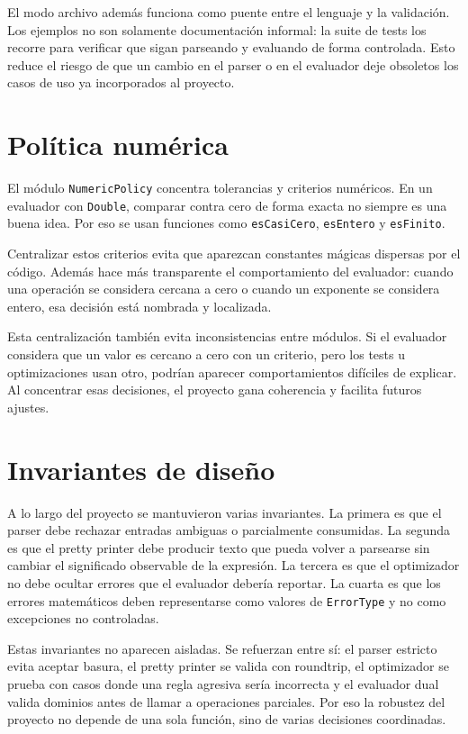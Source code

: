 \documentclass[11pt,a4paper]{article}
\begin{document}
El modo archivo además funciona como puente entre el lenguaje y la validación. Los ejemplos no son solamente documentación informal: la suite de tests los recorre para verificar que sigan parseando y evaluando de forma controlada. Esto reduce el riesgo de que un cambio en el parser o en el evaluador deje obsoletos los casos de uso ya incorporados al proyecto.

\section{Política numérica}

El módulo \texttt{NumericPolicy} concentra tolerancias y criterios numéricos. En un evaluador con \texttt{Double}, comparar contra cero de forma exacta no siempre es una buena idea. Por eso se usan funciones como \texttt{esCasiCero}, \texttt{esEntero} y \texttt{esFinito}.

Centralizar estos criterios evita que aparezcan constantes mágicas dispersas por el código. Además hace más transparente el comportamiento del evaluador: cuando una operación se considera cercana a cero o cuando un exponente se considera entero, esa decisión está nombrada y localizada.

Esta centralización también evita inconsistencias entre módulos. Si el evaluador considera que un valor es cercano a cero con un criterio, pero los tests u optimizaciones usan otro, podrían aparecer comportamientos difíciles de explicar. Al concentrar esas decisiones, el proyecto gana coherencia y facilita futuros ajustes.

\section{Invariantes de diseño}

A lo largo del proyecto se mantuvieron varias invariantes. La primera es que el parser debe rechazar entradas ambiguas o parcialmente consumidas. La segunda es que el pretty printer debe producir texto que pueda volver a parsearse sin cambiar el significado observable de la expresión. La tercera es que el optimizador no debe ocultar errores que el evaluador debería reportar. La cuarta es que los errores matemáticos deben representarse como valores de \texttt{ErrorType} y no como excepciones no controladas.

Estas invariantes no aparecen aisladas. Se refuerzan entre sí: el parser estricto evita aceptar basura, el pretty printer se valida con roundtrip, el optimizador se prueba con casos donde una regla agresiva sería incorrecta y el evaluador dual valida dominios antes de llamar a operaciones parciales. Por eso la robustez del proyecto no depende de una sola función, sino de varias decisiones coordinadas.
\end{document}
